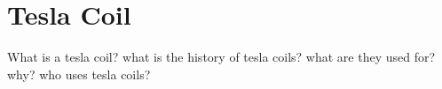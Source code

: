 \section{Tesla Coil}
What is a tesla coil? what is the history of tesla coils? what are they used for? why? who uses tesla coils?